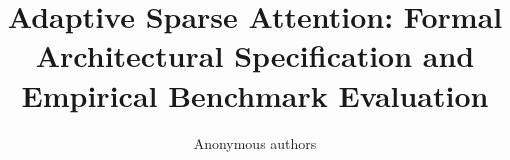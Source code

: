 \title{\textbf{Adaptive Sparse Attention: Formal Architectural Specification and Empirical Benchmark Evaluation}}

\author{Anonymous authors}
